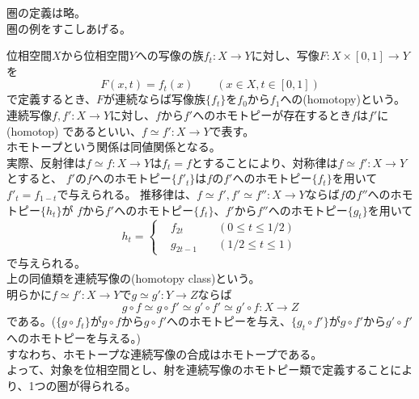 \documentclass[dvipdfmx,a4paper,11pt]{jsarticle}
\begin{document}
圏の定義は略。\\
圏の例をすこしあげる。
\begin{tcolorbox}[title = 例1]
  位相空間$X$から位相空間$Y$への写像の族$f_{t}:X\to Y$に対し、写像$F:X\times [0,1] \to Y$を
  \begin{equation*}
    F(x,t)=f_{t}(x)\qquad (x\in X,t \in [0,1])
  \end{equation*}
  で定義するとき、$F$が連続ならば写像族$\{f_t\}$を$f_0$から$f_1$への(homotopy)という。\\
  連続写像$f,f':X\to Y$に対し、$f$から$f'$へのホモトピーが存在するとき$f$は$f'$に(homotop)
  であるといい、$f\simeq f':X\to Y$で表す。\\
  ホモトープという関係は同値関係となる。\\
  実際、反射律は$f\simeq f:X\to Y$は$f_{t}=f$とすることにより、対称律は$f\simeq f':X\to Y$とすると、
  $f'$の$f$へのホモトピー$\{f'_{t}\}$は$f$の$f'$へのホモトピー$\{f_{t}\}$を用いて$f'_{t}=f_{1-t}$で与えられる。
  推移律は、$f\simeq f',f'\simeq f'':X\to Y$ならば$f$の$f''$へのホモトピー$\{h_{t}\}$が
  $f$から$f'$へのホモトピー$\{f_{t}\}$、$f'$から$f''$へのホモトピー$\{g_{t}\}$を用いて
  \begin{equation*}
    h_{t}=\left\{ 
    \begin{alignedat}{2}   
      &f_{2t}  \quad &(0\leq t\leq 1/2)\\   
      &g_{2t-1}\quad &(1/2\leq t\leq 1)
    \end{alignedat} 
    \right.
  \end{equation*}
  で与えられる。\\
  上の同値類を連続写像の(homotopy class)という。\\
  明らかに$f\simeq f':X\to Y$で$g\simeq g':Y\to Z$ならば\\
  \begin{equation*}
    g\circ f\simeq g\circ f'\simeq g'\circ f'\simeq g'\circ f:X \to Z
  \end{equation*}
  である。($\{g\circ f_{t}\}$が$g\circ f$から$g\circ f'$へのホモトピーを与え、$\{g_{t}\circ f'\}$が$g\circ f'$から$g'\circ f'$へのホモトピーを与える。)\\
  すなわち、ホモトープな連続写像の合成はホモトープである。\\
  よって、対象を位相空間とし、射を連続写像のホモトピー類で定義することにより、1つの圏が得られる。
\end{tcolorbox}

\clearpage
\end{document}
